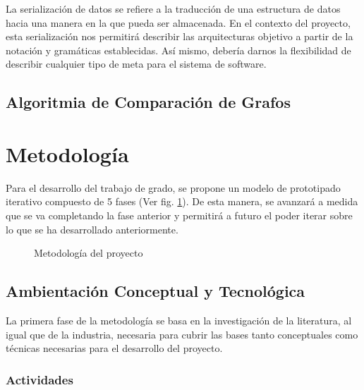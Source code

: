 \documentclass[12pt]{article}
\begin{document}

    La serialización de datos se refiere a la traducción de una estructura de datos hacia una manera en la que pueda ser almacenada. En el contexto del proyecto, esta serialización nos permitirá describir las arquitecturas objetivo a partir de la notación y gramáticas establecidas. Así mismo, debería darnos la flexibilidad de describir cualquier tipo de meta para el sistema de software.
    

    \subsection{Algoritmia de Comparación de Grafos} %



    \pagebreak

    \section{Metodología}

    Para el desarrollo del trabajo de grado, se propone un modelo de prototipado iterativo compuesto de 5 fases (Ver fig. \ref{fig:met}). De esta manera, se avanzará a medida que se va completando la fase anterior y permitirá a futuro el poder iterar sobre lo que se ha desarrollado anteriormente.

    \begin{figure}[H]
        \centering
        
        \caption{Metodología del proyecto}
        \label{fig:met}
    \end{figure}

    \subsection{Ambientación Conceptual y Tecnológica}

    La primera fase de la metodología se basa en la investigación de la literatura, al igual que de la industria, necesaria para cubrir las bases tanto conceptuales como técnicas necesarias para el desarrollo del proyecto. 

    \subsubsection*{Actividades}
\end{document}
